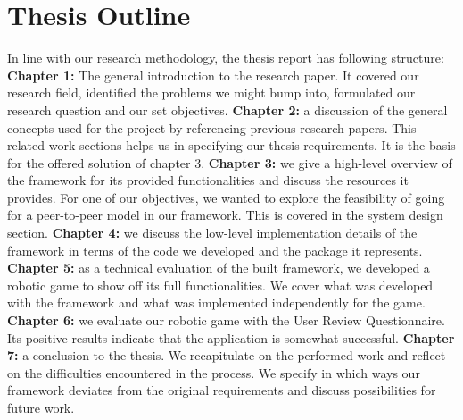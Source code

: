 \section{Thesis Outline}
In line with our research methodology, the thesis report has following structure:
\newline\newline 
\textbf{Chapter 1:} The general introduction to the research paper. It covered our research field, identified the problems we might bump into, formulated our research question and our set objectives.\newline\newline
\textbf{Chapter 2:} a discussion of the general concepts used for the project by referencing previous research papers. This related work sections helps us in specifying our thesis requirements. It is the basis for the offered solution of chapter 3.
\newline\newline
\textbf{Chapter 3:} we give a high-level overview of the framework for its provided functionalities and discuss the resources it provides. For one of our objectives, we wanted to explore the feasibility of going for a peer-to-peer model in our framework. This is covered in the system design section.
\newline\newline
\textbf{Chapter 4:} we discuss the low-level implementation details of the framework in terms of the code we developed and the package it represents. 
\newline\newline
\textbf{Chapter 5:} as a technical evaluation of the built framework, we developed a robotic game to show off its full functionalities. We cover what was developed with the framework and what was implemented independently for the game.
\newline\newline
\textbf{Chapter 6:} we evaluate our robotic game with the User Review Questionnaire. Its positive results indicate that the application is somewhat successful.  
\newline\newline
\textbf{Chapter 7:} a conclusion to the thesis. We recapitulate on the performed work and reflect on the difficulties encountered in the process. We specify in which ways our framework deviates from the original requirements and discuss possibilities for future work.
